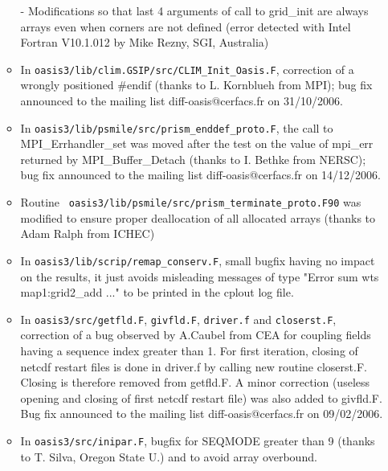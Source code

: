 \begin{itemize}
\begin{itemize}
    - Modifications so that last 4 arguments of call to grid\_init are 
    always arrays even when corners are not defined (error detected with 
    Intel Fortran V10.1.012 by Mike Rezny, SGI, Australia)

  \item In {\tt oasis3/lib/clim.GSIP/src/CLIM\_Init\_Oasis.F},
    correction of a wrongly positioned \#endif (thanks to L. Kornblueh
    from MPI); bug fix announced to the mailing list
    diff-oasis@cerfacs.fr on 31/10/2006.

  \item In {\tt oasis3/lib/psmile/src/prism\_enddef\_proto.F}, the
    call to MPI\_Errhandler\_set was moved after the test on the value
    of mpi\_err returned by MPI\_Buffer\_Detach (thanks to I. Bethke
    from NERSC); bug
    fix announced to the mailing list diff-oasis@cerfacs.fr on
    14/12/2006.

  \item Routine {\tt
      oasis3/lib/psmile/src/prism\_terminate\_proto.F90} was modified
    to ensure proper deallocation of all allocated arrays (thanks to
    Adam Ralph from ICHEC)
  

  \item In {\tt oasis3/lib/scrip/remap\_conserv.F}, small bugfix
    having no impact on the results, it just avoids misleading
    messages of type "Error sum wts map1:grid2\_add ..."  to be printed
    in the cplout log file.

  \item In {\tt oasis3/src/getfld.F}, {\tt givfld.F},
    {\tt driver.f} and {\tt closerst.F}, correction of a bug observed
    by A.Caubel from CEA for coupling fields having a sequence index
    greater than 1. For first iteration, closing of netcdf restart
    files is done in driver.f by calling new routine closerst.F.
    Closing is therefore removed from getfld.F.  A minor correction
    (useless opening and closing of first netcdf restart file) was
    also added to givfld.F. Bug
    fix announced to the mailing list diff-oasis@cerfacs.fr on
    09/02/2006.

  \item In {\tt oasis3/src/inipar.F}, bugfix for SEQMODE
    greater than 9 (thanks to T. Silva, Oregon State U.) and to
    avoid array overbound.


\end{itemize}
\end{itemize}

